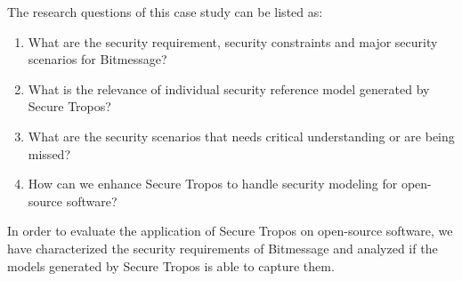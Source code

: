 \documentclass{acm_proc_article-sp}
\begin{document}
\par
The research questions of this case study can be listed as:
\begin{enumerate}
\item What are the security requirement, security constraints and major security scenarios for Bitmessage?
\item What is the relevance of individual security reference model generated by Secure Tropos?
\item What are the security scenarios that needs critical understanding or are being missed?
\item How can we enhance Secure Tropos to handle security modeling for open-source software?
\end{enumerate}

In order to evaluate the application of Secure Tropos on open-source software, we have characterized the security requirements of Bitmessage and analyzed if the models generated by Secure Tropos is able to capture them.

\end{document}
